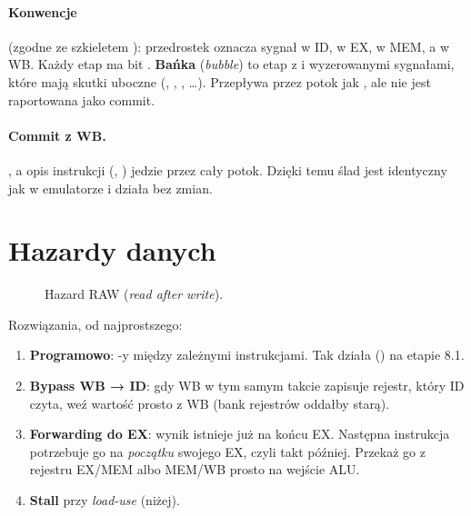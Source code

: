 \paragraph{Konwencje} (zgodne ze szkieletem ): przedrostek
 oznacza sygnał w ID,  w EX,  w MEM, a  w WB.
Każdy etap ma bit . \textbf{Bańka} (\emph{bubble}) to etap z
 i wyzerowanymi sygnałami, które mają skutki uboczne
(, , ,  \dots). Przepływa
przez potok jak , ale nie jest raportowana jako commit.

\paragraph{Commit z WB.} , a opis instrukcji
(, ) jedzie przez cały potok. Dzięki temu ślad jest identyczny
jak w emulatorze i  działa bez zmian.

\section{Hazardy danych}

\begin{figure}[h]
\centering
{}
\caption{Hazard RAW (\emph{read after write}).}
\end{figure}

Rozwiązania, od najprostszego:
\begin{enumerate}
  \item \textbf{Programowo}: -y między zależnymi instrukcjami. Tak
    działa  () na etapie 8.1.
  \item \textbf{Bypass WB → ID}: gdy WB w tym samym takcie zapisuje rejestr, który
    ID czyta, weź wartość prosto z WB (bank rejestrów oddałby starą).
  \item \textbf{Forwarding do EX}: wynik  istnieje już na końcu EX.
    Następna instrukcja potrzebuje go na \emph{początku} swojego EX, czyli takt
    później. Przekaż go z rejestru EX/MEM albo MEM/WB prosto na wejście ALU.
  \item \textbf{Stall} przy \emph{load-use} (niżej).
\end{enumerate}

